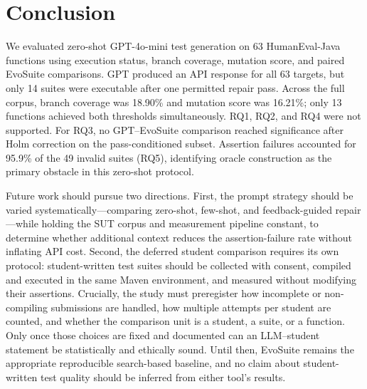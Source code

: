 \section{Conclusion}
\label{sec:conclusion}

We evaluated zero-shot GPT-4o-mini test generation on 63 HumanEval-Java functions using execution status, branch coverage, mutation score, and paired EvoSuite comparisons. GPT produced an API response for all 63 targets, but only 14 suites were executable after one permitted repair pass. Across the full corpus, branch coverage was 18.90\% and mutation score was 16.21\%; only 13 functions achieved both thresholds simultaneously. RQ1, RQ2, and RQ4 were not supported. For RQ3, no GPT--EvoSuite comparison reached significance after Holm correction on the pass-conditioned subset. Assertion failures accounted for 95.9\% of the 49 invalid suites (RQ5), identifying oracle construction as the primary obstacle in this zero-shot protocol.

Future work should pursue two directions. First, the prompt strategy should be varied systematically---comparing zero-shot, few-shot, and feedback-guided repair---while holding the SUT corpus and measurement pipeline constant, to determine whether additional context reduces the assertion-failure rate without inflating API cost. Second, the deferred student comparison requires its own protocol: student-written test suites should be collected with consent, compiled and executed in the same Maven environment, and measured without modifying their assertions. Crucially, the study must preregister how incomplete or non-compiling submissions are handled, how multiple attempts per student are counted, and whether the comparison unit is a student, a suite, or a function. Only once those choices are fixed and documented can an LLM--student statement be statistically and ethically sound. Until then, EvoSuite remains the appropriate reproducible search-based baseline, and no claim about student-written test quality should be inferred from either tool's results.
